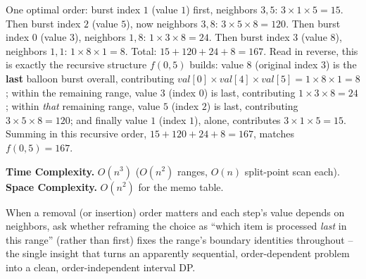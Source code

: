 One optimal order: burst index $1$ (value $1$) first, neighbors $3,5$:
$3\times1\times5=15$. Then burst index $2$ (value $5$), now neighbors
$3,8$: $3\times5\times8=120$. Then burst index $0$ (value $3$),
neighbors $1,8$: $1\times3\times8=24$. Then burst index $3$ (value
$8$), neighbors $1,1$: $1\times8\times1=8$. Total: $15+120+24+8=167$. Read in reverse, this is exactly the
recursive structure $f(0,5)$ builds: value $8$ (original index $3$) is
the \textbf{last} balloon burst overall, contributing
$\textit{val}[0]\times\textit{val}[4]\times\textit{val}[5]=1\times8\times1=8$;
within the remaining range, value $3$ (index $0$) is last, contributing
$1\times3\times8=24$; within \emph{that} remaining range, value $5$
(index $2$) is last, contributing $3\times5\times8=120$; and finally
value $1$ (index $1$), alone, contributes $3\times1\times5=15$.
Summing in this recursive order, $15+120+24+8=167$, matches
$f(0,5)=167$.

\begin{complexitybox}
\textbf{Time Complexity.} $O(n^3)$ ($O(n^2)$ ranges, $O(n)$ split-point
scan each).
\textbf{Space Complexity.} $O(n^2)$ for the memo table.
\end{complexitybox}

\begin{takeawaybox}
When a removal (or insertion) order matters and each step's value
depends on neighbors, ask whether reframing the choice as ``which item
is processed \emph{last} in this range'' (rather than first) fixes the
range's boundary identities throughout -- the single insight that turns
an apparently sequential, order-dependent problem into a clean,
order-independent interval DP.
\end{takeawaybox}
